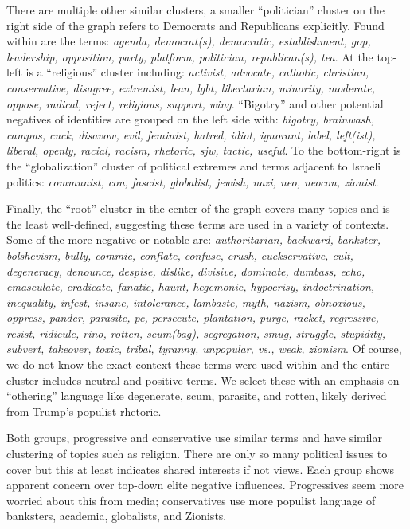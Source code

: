 \documentclass[doublespacing]{utdthesis}
\begin{document}
There are multiple other similar clusters, a smaller ``politician'' cluster on the right side of the graph refers to Democrats and Republicans explicitly.
Found within are the terms: \emph{agenda, democrat(s), democratic, establishment, gop, leadership, opposition, party, platform, politician, republican(s), tea}.
At the top-left is a ``religious'' cluster including: \emph{activist, advocate, catholic, christian, conservative, disagree, extremist, lean, lgbt, libertarian, minority, moderate, oppose, radical, reject, religious, support, wing}. 
``Bigotry'' and other potential negatives of identities are grouped on the left side with: \emph{bigotry, brainwash, campus, cuck, disavow, evil, feminist, hatred, idiot, ignorant, label, left(ist), liberal, openly, racial, racism, rhetoric, sjw, tactic, useful}.
To the bottom-right is the ``globalization'' cluster of political extremes and terms adjacent to Israeli politics: \emph{communist, con, fascist, globalist, jewish, nazi, neo, neocon, zionist}.

Finally, the ``root'' cluster in the center of the graph covers many topics and is the least well-defined, suggesting these terms are used in a variety of contexts.
Some of the more negative or notable are: \emph{authoritarian, backward, bankster, bolshevism, bully, commie, conflate, confuse, crush, cuckservative, cult, degeneracy, denounce, despise, dislike, divisive, dominate, dumbass, echo, emasculate, eradicate, fanatic, haunt, hegemonic, hypocrisy, indoctrination, inequality, infest, insane, intolerance, lambaste, myth, nazism, obnoxious, oppress, pander, parasite, pc, persecute, plantation, purge, racket, regressive, resist, ridicule, rino, rotten, scum(bag), segregation, smug, struggle, stupidity, subvert, takeover, toxic, tribal, tyranny, unpopular, vs., weak, zionism}.
Of course, we do not know the exact context these terms were used within and the entire cluster includes neutral and positive terms.
We select these with an emphasis on ``othering'' language like degenerate, scum, parasite, and rotten, likely derived from Trump's populist rhetoric.

Both groups, progressive and conservative use similar terms and have similar clustering of topics such as religion.
There are only so many political issues to cover but this at least indicates shared interests if not views.
Each group shows apparent concern over top-down elite negative influences.
Progressives seem more worried about this from media; conservatives use more populist language of banksters, academia, globalists, and Zionists.
\end{document}
